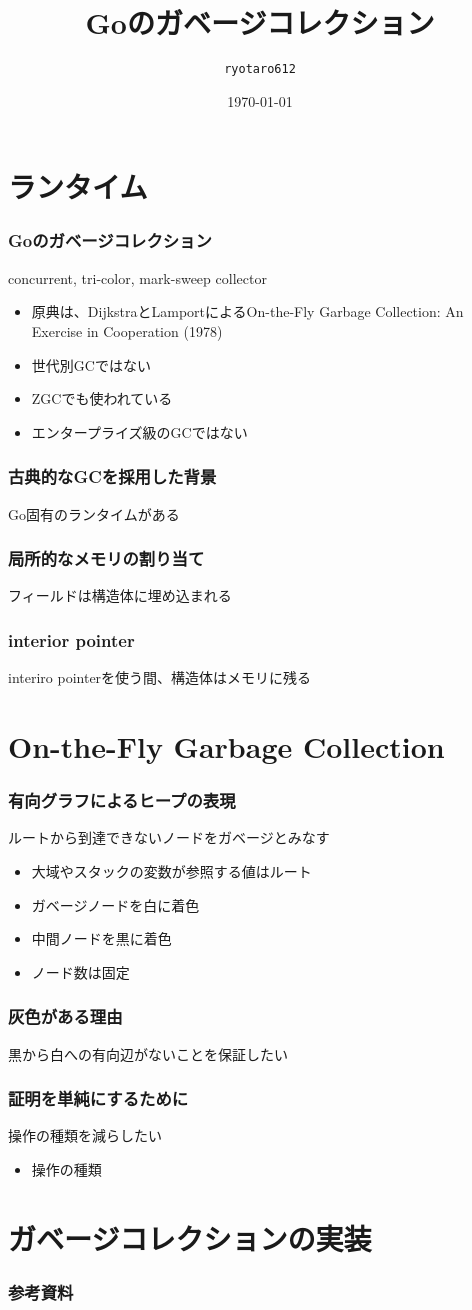 \documentclass[unicode, 14pt, aspectratio=169]{beamer}
\date{\today}
\title{Goのガベージコレクション}
\author{\texttt{ryotaro612}}
\begin{document}
\begin{frame}
\titlepage
\end{frame}
\section{ランタイム}
\begin{frame}
  \frametitle{Goのガベージコレクション}
  {\large concurrent, tri-color, mark-sweep collector\supercite{go15gc}}
  \begin{itemize}
  \item 原典は、DijkstraとLamportによるOn-the-Fly Garbage Collection: An Exercise in Cooperation (1978)
  \item 世代別GCではない
  \item ZGCでも使われている
  \item エンタープライズ級のGCではない
  \end{itemize}
\end{frame}
\begin{frame}
  \frametitle{古典的なGCを採用した背景}
  {\large Go固有のランタイムがある}
\end{frame}
\begin{frame}
  \frametitle{局所的なメモリの割り当て}
  {\large フィールドは構造体に埋め込まれる}
\end{frame}
\begin{frame}
  \frametitle{interior pointer}
  {\large interiro pointerを使う間、構造体はメモリに残る}
\end{frame}
\section{On-the-Fly Garbage Collection}
\begin{frame}
  \frametitle{有向グラフによるヒープの表現}
  {\large ルートから到達できないノードをガベージとみなす}
  \begin{itemize}
  \item 大域やスタックの変数が参照する値はルート
  \item ガベージノードを白に着色
  \item 中間ノードを黒に着色
  \item ノード数は固定
  \end{itemize}
\end{frame}
\begin{frame}
  \frametitle{灰色がある理由}
  {\large 黒から白への有向辺がないことを保証したい}
\end{frame}
\begin{frame}
  \frametitle{証明を単純にするために}
  {\large 操作の種類を減らしたい}
  \begin{itemize}
    \item 操作の種類
  \end{itemize}
\end{frame}
\section{ガベージコレクションの実装}
\begin{frame}[allowframebreaks,t]
  \frametitle{参考資料}
  \printbibliography
  \nocite{*}
\end{frame}
\end{document}

